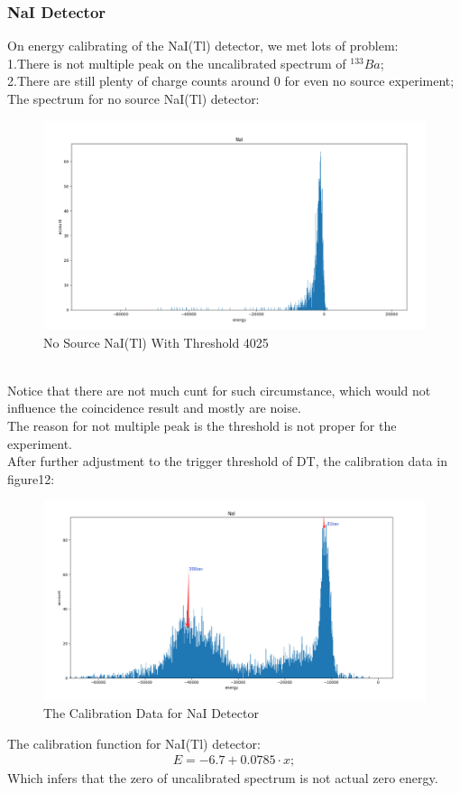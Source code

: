 \documentclass[12pt]{article}
\begin{document}
	\subsubsection{NaI Detector}
	On energy calibrating of the NaI(Tl) detector, we met lots of problem:\\
	1.There is not multiple peak on the uncalibrated spectrum of $^{133}Ba$;\\
	2.There are still plenty of charge counts around 0 for even no source experiment;\\	
	The spectrum for no source NaI(Tl) detector:
	\begin{figure}[h]
		\centering
		\includegraphics[width=0.7\linewidth, height=0.2\textheight]{pic/NO_source_NaI}
		\caption{No Source NaI(Tl) With Threshold 4025}
		\label{fig:nosourcenai}
	\end{figure}\\
	Notice that there are not much cunt for such circumstance, which would not influence the coincidence result and mostly are noise.\\ 
	The reason for not multiple peak is the threshold is not proper for the experiment.\\
	After further adjustment to the trigger threshold of DT, the calibration data in figure12:
	\begin{figure}[h]
		\centering
		\includegraphics[width=0.7\linewidth, height=0.2\textheight]{pic/NaI_calibration}
		\caption{The Calibration Data for NaI Detector}
		\label{fig:naicalibration}
	\end{figure}
	The calibration function for NaI(Tl) detector:
	\begin{gather}
		E=-6.7+0.0785\cdot x;
	\end{gather}
	Which infers that the zero of uncalibrated spectrum is not actual zero energy.
	
\end{document}
